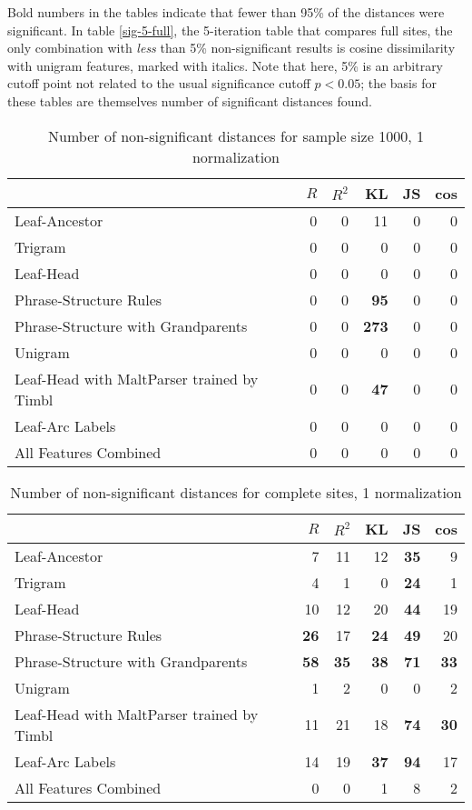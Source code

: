Bold numbers in the tables indicate that fewer than 95\% of the
distances were significant. In table \ref{sig-5-full}, the
5-iteration table that compares full sites, the only combination
with {\it less} than 5\% non-significant results is cosine
dissimilarity with unigram features, marked with italics. Note that
here, 5\% is an arbitrary cutoff point not related to the usual
significance cutoff $p < 0.05$; the basis for these tables are
themselves number of significant distances found.

\begin{table}
\begin{tabular}{l|rrrrr}
  & $R$ & $R^2$ & KL & JS & cos  \\ \hline
  Leaf-Ancestor &0&0&11&0&0 \\
  Trigram &0&0&0&0&0 \\
  Leaf-Head &0&0&0&0&0 \\
  Phrase-Structure Rules &0&0&\textbf{95}&0&0 \\
  Phrase-Structure with Grandparents &0&0&\textbf{273}&0&0 \\
  Unigram &0&0&0&0&0 \\
  Leaf-Head with MaltParser trained by Timbl &0&0&\textbf{47}&0&0 \\
  Leaf-Arc Labels&0&0&0&0&0 \\
  All Features Combined &0&0&0&0&0 \\
\end{tabular}
\caption{Number of non-significant distances for sample size 1000, 1
  normalization}
\label{sig-1-1000}
\end{table}

\begin{table}
\begin{tabular}{l|rrrrr}
& $R$ & $R^2$ & KL & JS & cos  \\ \hline
  Leaf-Ancestor&7&11&12&\textbf{35}&9 \\
  Trigram&4&1&0&\textbf{24}&1 \\
  Leaf-Head&10&12&20&\textbf{44}&19 \\
  Phrase-Structure Rules&\textbf{26}&17&\textbf{24}&\textbf{49}&20 \\
  Phrase-Structure with Grandparents&\textbf{58}&\textbf{35}&\textbf{38}&\textbf{71}&\textbf{33}
   \\
  Unigram&1&2&0&0&2 \\
  Leaf-Head with MaltParser trained by Timbl&11&21&18&\textbf{74}&\textbf{30}
   \\
  Leaf-Arc Labels&14&19&\textbf{37}&\textbf{94}&17 \\
  All Features Combined&0&0&1&8&2 \\
\end{tabular}
 \caption{Number of non-significant distances for complete sites, 1
   normalization}
 \label{sig-1-full}
\end{table}

